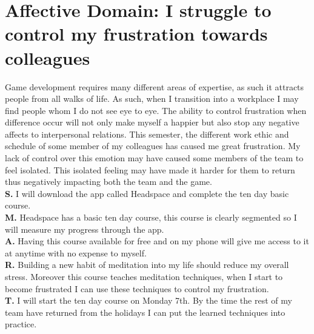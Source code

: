 \documentclass{scrartcl}
\begin{document}
\section{Affective Domain: I struggle to control my frustration towards colleagues}
Game development requires many different areas of expertise, as such it attracts people from all walks of life. As such, when I transition into a workplace I may find people whom I do not see eye to eye. The ability to control frustration when difference occur will not only make myself a happier but also stop any negative affects to interpersonal relations. This semester, the different work ethic and schedule of some member of my colleagues has caused me great frustration. My lack of control over this emotion may have caused some members of the team to feel isolated. This isolated feeling may have made it harder for them to return thus negatively impacting both the team and the game. \\
\textbf{S.}    I will download the app called Headspace and complete the ten day basic course.\\
\textbf{M.}   Headspace has a basic ten day course, this course is clearly segmented so I will measure my progress through the app.\\
\textbf{A.}   Having this course available for free and on my phone will give me access to it at anytime with no expense to myself. \\
\textbf{R.}  Building a new habit of meditation into my life should reduce my overall stress. Moreover this course teaches meditation techniques, when I start to become frustrated I can use these techniques to control my frustration.\\
\textbf{T.}  I will start the ten day course on Monday 7th. By the time the rest of my team have returned from the holidays I can put the learned techniques into practice.\\
\end{document}
